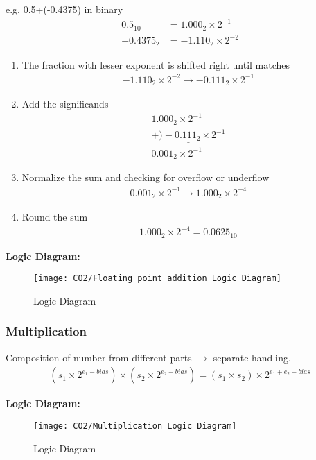 e.g. 0.5+(-0.4375) in binary
\begin{align*}
    0.5_{10}&=1.000_2\times2^{-1}\\
    -0.4375_2&=-1.110_2\times 2^{-2}
\end{align*}
\begin{enumerate}
    \item The fraction with lesser exponent is shifted right until matches
    \begin{align*}
        -1.110_2 \times 2^{-2} \rightarrow -0.111_2\times 2^{-1}
    \end{align*}
    \item Add the significands
    \begin{align*}
        1.000_2\times 2^{-1}\\
        \underline{+) - 0.111_2\times 2^{-1}}\\
        0.001_2\times 2^{-1}
    \end{align*}
    \item Normalize the sum and checking for overflow or underflow
    \begin{align*}
        0.001_2\times 2^{-1} \rightarrow 1.000_2\times 2^{-4}
    \end{align*}
    \item Round the sum
    \begin{align*}
        1.000_2\times 2^{-4}=0.0625_{10}
    \end{align*}
\end{enumerate}

\textbf{Logic Diagram:}

\begin{figure}[H]
    \centering
    \texttt{[image: CO2/Floating point addition Logic Diagram]}
    \caption{Logic Diagram}
\end{figure}

\subsubsection{Multiplication}
Composition of number from different parts $\rightarrow$ separate handling. 
\begin{align*}
    (s_1 \times 2^{e_1-bias})\times(s_2\times 2^{e_2-bias})=(s_1\times s_2)\times 2^{e_1+e_2-bias}
\end{align*}

\textbf{Logic Diagram:}

\begin{figure}[H]
    \centering
    \texttt{[image: CO2/Multiplication Logic Diagram]}
    \caption{Logic Diagram}
\end{figure}




